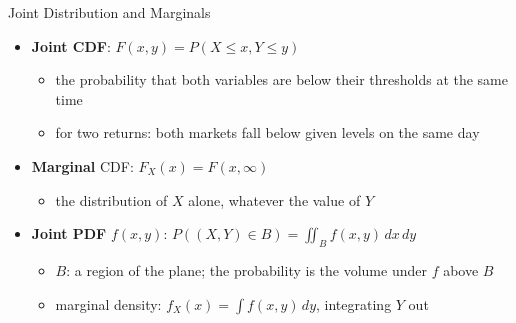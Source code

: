 \begin{frame}{Joint Distribution and Marginals}
\itemsize{\small}
\begin{itemize}
    \item \textbf{Joint CDF}: $F(x, y) = P(X \le x, Y \le y)$
    \begin{itemize}
        \item the probability that both variables are below their thresholds at the same time
        \item for two returns: both markets fall below given levels on the same day
    \end{itemize}
    \item \textbf{Marginal} CDF: $F_X(x) = F(x, \infty)$
    \begin{itemize}
        \item the distribution of $X$ alone, whatever the value of $Y$
    \end{itemize}
    \item \textbf{Joint PDF} $f(x, y)$: $P((X, Y) \in B) = \iint_B f(x, y)\,dx\,dy$
    \begin{itemize}
        \item $B$: a region of the plane; the probability is the volume under $f$ above $B$
        \item marginal density: $f_X(x) = \int f(x, y)\,dy$, integrating $Y$ out
    \end{itemize}
\end{itemize}
\end{frame}

